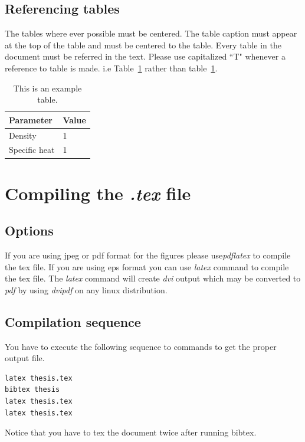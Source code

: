 \documentclass[a4paper,twoside]{iiththesis}
\begin{document}
\section{Referencing tables}
The tables where ever possible must be centered. The table caption must appear at the top of the table and must be centered to the table. Every table in the document must be referred in the text. Please use capitalized ``T" whenever a reference to table is made. i.e Table~\ref{extable} rather than table~\ref{extable}.
\begin{table}[h]
\centering
\caption{This is an example table.}
\begin{tabular}{l l}
\hline
Parameter & Value \\
\hline
Density & 1 \\
Specific heat & 1 \\
\hline
\end{tabular}
\label{extable}
\end{table}

\chapter{Compiling the \textit{.tex} file }
\label{compiling}

\section{Options}
If you are using jpeg or pdf format for the figures please use\textit{pdflatex} to compile the tex file. If you are using eps format you can use \textit{latex} command to compile the tex file. The \textit{latex} command will create \textit{dvi} output which may be converted to \textit{pdf} by using \textit{dvipdf} on any linux distribution. 

\section{Compilation sequence}
You have to execute the following sequence to commands to get the proper output file.
\begin{verbatim}
latex thesis.tex
bibtex thesis
latex thesis.tex
latex thesis.tex
\end{verbatim}
Notice that you have to tex the document twice after running bibtex.\\

\clearpage
\newpage
{} %


\end{document}
